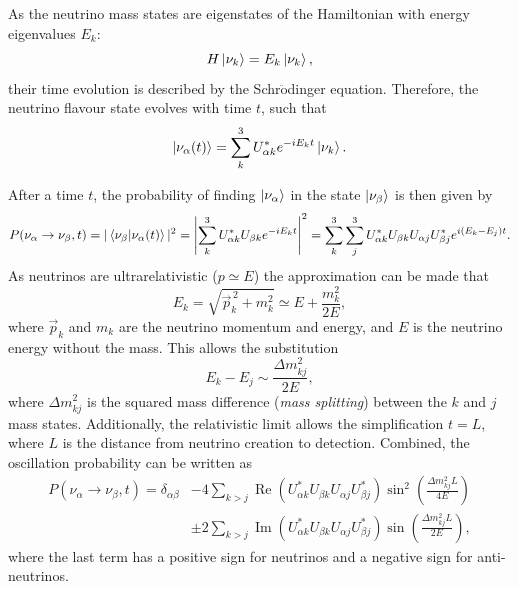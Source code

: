 As the neutrino mass states are eigenstates of the Hamiltonian with energy eigenvalues $E_{k}$:
\begin{equation} %
    H \ket{\nu_{k}} = E_{k} \ket{\nu_{k}},
    \label{eq:hamiltonian}
\end{equation}
their time evolution is described by the Schr$\mathrm{\ddot{o}}$dinger equation. Therefore, the
neutrino flavour state evolves with time $t$, such that
\begin{equation} %
    \ket{\nu_{\alpha}(t)}=\sum_{k}^{3}U_{\alpha k}^{*}e^{-iE_{k}t}\ket{\nu_{k}}.
    \label{eq:time_evolution_1}
\end{equation}

After a time $t$, the probability of finding $\ket{\nu_{\alpha}}$ in the state $\ket{\nu_{\beta}}$
is then given by
\begin{equation} %
    P(\nu_{\alpha} \rightarrow \nu_{\beta}, t) = |\braket{\nu_{\beta}|\nu_{\alpha}(t)}|^{2}=
    \abs*{\sum_{k}^{3}U_{\alpha k}^{*}U_{\beta k}e^{-iE_{k}t}}^{2} \\
    =\sum_{k}^{3}\sum_{j}^{3}U_{\alpha k}^{*}U_{\beta k}U_{\alpha j}U_{\beta j}^{*}
    e^{i(E_{k}-E_{j})t}.
    \label{eq:osc_prob_1}
\end{equation}
As neutrinos are ultrarelativistic ($p\simeq E$) the approximation can be made that
\begin{equation} %
    E_{k}=\sqrt{\vec{p}_{k}^{\,2}+m_{k}^{2}}\simeq E+\frac{m_{k}^{2}}{2E},
    \label{eq:energy_mass_momentum}
\end{equation}
where $\vec{p}_{k}$ and $m_{k}$ are the neutrino momentum and energy, and $E$ is the neutrino
energy without the mass. This allows the substitution
\begin{equation} %
    E_{k}-E_{j}\sim\frac{\Delta m_{kj}^{2}}{2E},
    \label{eq:sub}
\end{equation}
where $\Delta m_{kj}^{2}$ is the squared mass difference (\emph{mass splitting}) between the $k$
and $j$ mass states. Additionally, the relativistic limit allows the simplification $t = L$, where
$L$ is the distance from neutrino creation to detection. Combined, the oscillation probability can
be written as
\begin{align} %
    P(\nu_{\alpha} \rightarrow \nu_{\beta}, t) = \delta_{\alpha\beta} & - 4\sum_{k>j}\operatorname{Re}(
    U_{\alpha k}^{*}U_{\beta k}U_{\alpha j}U_{\beta j}^{*})\sin^{2}\left(\frac{\Delta
        m_{kj}^{2}L}{4E}\right) \nonumber
    \\  & \pm 2\sum_{k>j}\operatorname{Im}(
    U_{\alpha k}^{*}U_{\beta k}U_{\alpha j}U_{\beta j}^{*})\sin\left(\frac{\Delta
        m_{kj}^{2}L}{2E}\right),
    \label{eq:osc_prob_2}
\end{align}
where the last term has a positive sign for neutrinos and a negative sign for anti-neutrinos.

